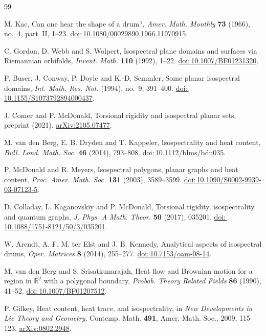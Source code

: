 \documentclass[11pt]{article}
\newcommand{\doi}[1]{\href{https://doi.org/#1}{doi:\,#1}}
\begin{document}
\begin{thebibliography}{99}
\small
\raggedright
{}
M. Kac, Can one hear the shape of a drum?,
\emph{Amer. Math. Monthly} \textbf{73} (1966), no.~4, part~II,
1--23. \doi{10.1080/00029890.1966.11970915}.

C. Gordon, D. Webb and S. Wolpert, Isospectral plane domains and
surfaces via Riemannian orbifolds, \emph{Invent. Math.}
\textbf{110} (1992), 1--22. \doi{10.1007/BF01231320}.

P. Buser, J. Conway, P. Doyle and K.-D. Semmler, Some planar
isospectral domains, \emph{Int. Math. Res. Not.} (1994), no.~9,
391--400. \doi{10.1155/S1073792894000437}.

J. Comer and P. McDonald, Torsional rigidity and isospectral planar
sets, preprint (2021). \href{https://arxiv.org/abs/2105.07477}{arXiv:2105.07477}.

M. van den Berg, E. B. Dryden and T. Kappeler, Isospectrality and heat
content, \emph{Bull. Lond. Math. Soc.} \textbf{46} (2014), 793--808.
\doi{10.1112/blms/bdu035}.

P. McDonald and R. Meyers, Isospectral polygons, planar graphs and heat
content, \emph{Proc. Amer. Math. Soc.} \textbf{131} (2003), 3589--3599.
\doi{10.1090/S0002-9939-03-07123-5}.

D. Colladay, L. Kaganovskiy and P. McDonald, Torsional rigidity,
isospectrality and quantum graphs, \emph{J. Phys. A Math. Theor.}
\textbf{50} (2017), 035201. \doi{10.1088/1751-8121/50/3/035201}.

W. Arendt, A. F. M. ter Elst and J. B. Kennedy, Analytical aspects
of isospectral drums, \emph{Oper. Matrices} \textbf{8} (2014),
255--277. \doi{10.7153/oam-08-14}.

M. van den Berg and S. Srisatkunarajah, Heat flow and Brownian motion
for a region in $\mathbb R^2$ with a polygonal boundary,
\emph{Probab. Theory Related Fields} \textbf{86} (1990), 41--52.
\doi{10.1007/BF01207512}.

P. Gilkey, Heat content, heat trace, and isospectrality, in
\emph{New Developments in Lie Theory and Geometry},
Contemp. Math. \textbf{491}, Amer. Math. Soc., 2009, 115--123.
\href{https://arxiv.org/abs/0802.2948}{arXiv:0802.2948}.
\end{thebibliography}
\end{document}
